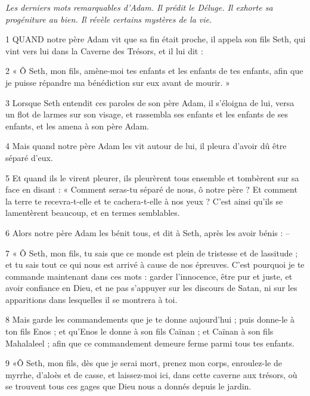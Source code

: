 \par \textit{Les derniers mots remarquables d'Adam. Il prédit le Déluge. Il exhorte sa progéniture au bien. Il révèle certains mystères de la vie.}

\par 1 QUAND notre père Adam vit que sa fin était proche, il appela son fils Seth, qui vint vers lui dans la Caverne des Trésors, et il lui dit :

\par 2 « Ô Seth, mon fils, amène-moi tes enfants et les enfants de tes enfants, afin que je puisse répandre ma bénédiction sur eux avant de mourir. »

\par 3 Lorsque Seth entendit ces paroles de son père Adam, il s'éloigna de lui, versa un flot de larmes sur son visage, et rassembla ses enfants et les enfants de ses enfants, et les amena à son père Adam.

\par 4 Mais quand notre père Adam les vit autour de lui, il pleura d'avoir dû être séparé d'eux.

\par 5 Et quand ils le virent pleurer, ils pleurèrent tous ensemble et tombèrent sur sa face en disant : « Comment seras-tu séparé de nous, ô notre père ? Et comment la terre te recevra-t-elle et te cachera-t-elle à nos yeux ? C'est ainsi qu'ils se lamentèrent beaucoup, et en termes semblables.

\par 6 Alors notre père Adam les bénit tous, et dit à Seth, après les avoir bénis : --

\par 7 « Ô Seth, mon fils, tu sais que ce monde est plein de tristesse et de lassitude ; et tu sais tout ce qui nous est arrivé à cause de nos épreuves. C'est pourquoi je te commande maintenant dans ces mots : garder l'innocence, être pur et juste, et avoir confiance en Dieu, et ne pas s'appuyer sur les discours de Satan, ni sur les apparitions dans lesquelles il se montrera à toi.

\par 8 Mais garde les commandements que je te donne aujourd'hui ; puis donne-le à ton fils Enos ; et qu'Enos le donne à son fils Caïnan ; et Caïnan à son fils Mahalaleel ; afin que ce commandement demeure ferme parmi tous tes enfants.

\par 9 «Ô Seth, mon fils, dès que je serai mort, prenez mon corps, enroulez-le de myrrhe, d'aloès et de casse, et laissez-moi ici, dans cette caverne aux trésors, où se trouvent tous ces gages que Dieu nous a donnés depuis le jardin.

